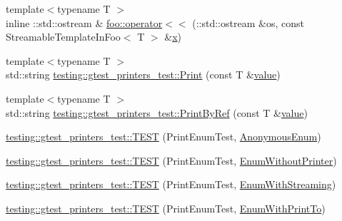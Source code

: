 \begin{DoxyCompactItemize}
{\footnotesize template$<$typename T $>$ }\\inline \+::std\+::ostream \& \mbox{\hyperlink{namespacefoo_abe04f604d114085b0b9af25600ef00da}{foo\+::operator$<$$<$}} (\+::std\+::ostream \&os, const Streamable\+Template\+In\+Foo$<$ T $>$ \&\mbox{\hyperlink{_obj__test_2lib_2googletest-master_2googlemock_2test_2gmock-matchers__test_8cc_a6150e0515f7202e2fb518f7206ed97dc}{x}})
\item 
{\footnotesize template$<$typename T $>$ }\\std\+::string \mbox{\hyperlink{namespacetesting_1_1gtest__printers__test_ab1fefdb330a473343afa3cc6d46a65f6}{testing\+::gtest\+\_\+printers\+\_\+test\+::\+Print}} (const T \&\mbox{\hyperlink{_obj__test_2lib_2googletest-master_2googlemock_2test_2gmock-matchers__test_8cc_a337b8a670efc0b086ad3af163f3121b6}{value}})
\item 
{\footnotesize template$<$typename T $>$ }\\std\+::string \mbox{\hyperlink{namespacetesting_1_1gtest__printers__test_a680e1fd7cfbae100466abe89567a0ee9}{testing\+::gtest\+\_\+printers\+\_\+test\+::\+Print\+By\+Ref}} (const T \&\mbox{\hyperlink{_obj__test_2lib_2googletest-master_2googlemock_2test_2gmock-matchers__test_8cc_a337b8a670efc0b086ad3af163f3121b6}{value}})
\item 
\mbox{\hyperlink{namespacetesting_1_1gtest__printers__test_ac79ac1529e754dddbaff5ba108ba3de3}{testing\+::gtest\+\_\+printers\+\_\+test\+::\+T\+E\+ST}} (Print\+Enum\+Test, \mbox{\hyperlink{googletest-master_2googletest_2test_2googletest-printers-test_8cc_a7a5ee9fe858568a85d80af1312aefb8b}{Anonymous\+Enum}})
\item 
\mbox{\hyperlink{namespacetesting_1_1gtest__printers__test_ae435934e9be88c7813ac6aee2ce0ce53}{testing\+::gtest\+\_\+printers\+\_\+test\+::\+T\+E\+ST}} (Print\+Enum\+Test, \mbox{\hyperlink{googletest-master_2googletest_2test_2googletest-printers-test_8cc_a404f735da62338180a19ae16f80e09c8}{Enum\+Without\+Printer}})
\item 
\mbox{\hyperlink{namespacetesting_1_1gtest__printers__test_a152cda5e11caecc372208103022726d1}{testing\+::gtest\+\_\+printers\+\_\+test\+::\+T\+E\+ST}} (Print\+Enum\+Test, \mbox{\hyperlink{googletest-master_2googletest_2test_2googletest-printers-test_8cc_a52d9f846ca7a081ba3acf88dd6cd46dc}{Enum\+With\+Streaming}})
\item 
\mbox{\hyperlink{namespacetesting_1_1gtest__printers__test_a171e23e5a52e6b7355c00daf8391ec12}{testing\+::gtest\+\_\+printers\+\_\+test\+::\+T\+E\+ST}} (Print\+Enum\+Test, \mbox{\hyperlink{googletest-master_2googletest_2test_2googletest-printers-test_8cc_a904d619d593201ed509be794aed041ec}{Enum\+With\+Print\+To}})

\end{DoxyCompactItemize}
